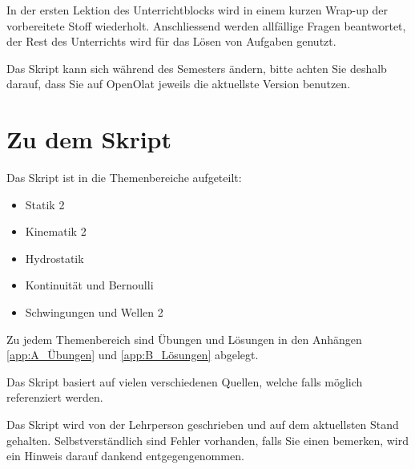 In der ersten Lektion des Unterrichtblocks wird in einem kurzen Wrap-up der vorbereitete Stoff wiederholt.
Anschliessend werden allfällige Fragen beantwortet, der Rest des Unterrichts wird für das Lösen von Aufgaben genutzt.

Das Skript kann sich während des Semesters ändern, bitte achten Sie deshalb darauf, dass Sie auf
OpenOlat jeweils die aktuellste Version benutzen.

\section{Zu dem Skript}

Das Skript ist in die Themenbereiche aufgeteilt:

\begin{itemize}
    \item Statik 2
    \item Kinematik 2
    \item Hydrostatik
    \item Kontinuität und Bernoulli
    \item Schwingungen und Wellen 2
\end{itemize}

Zu jedem Themenbereich sind Übungen und Lösungen in den Anhängen \ref{app:A_Übungen} und \ref{app:B_Lösungen} abgelegt.

Das Skript basiert auf vielen verschiedenen Quellen, welche falls möglich referenziert werden.

Das Skript wird von der Lehrperson geschrieben und auf dem aktuellsten Stand gehalten.
Selbstverständlich sind Fehler vorhanden, falls Sie einen bemerken, wird ein Hinweis darauf
dankend entgegengenommen.